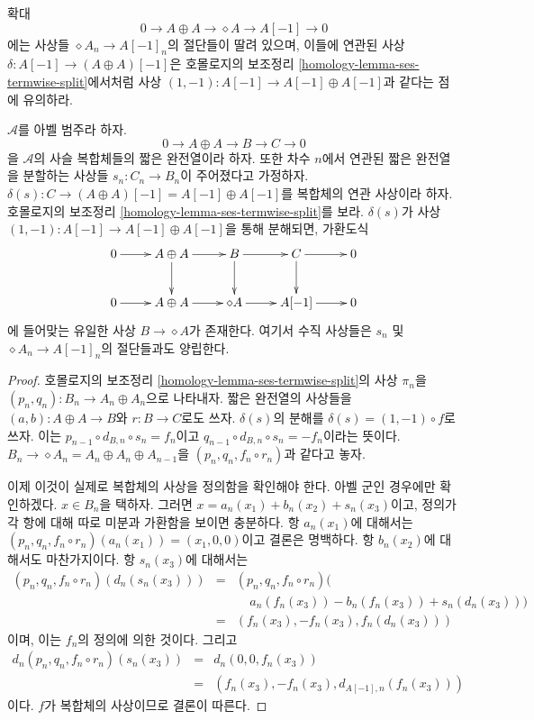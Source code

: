 \noindent
확대
$$
0 \to
A \oplus A \to
\diamond A \to
A[-1] \to
0
$$
에는 사상들 $\diamond A_n \to A[-1]_n$의 절단들이 딸려 있으며,
이들에 연관된 사상 $\delta : A[-1] \to (A \oplus A)[-1]$은
호몰로지의 보조정리 \ref{homology-lemma-ses-termwise-split}에서처럼
사상 $(1, -1) : A[-1] \to A[-1] \oplus A[-1]$과 같다는 점에 유의하라.

\begin{lemma}
\label{lemma-map-into-diamond}
$\mathcal{A}$를 아벨 범주라 하자.
$$
0 \to A \oplus A \to B \to C \to 0
$$
을 $\mathcal{A}$의 사슬 복합체들의 짧은 완전열이라 하자. 또한
차수 $n$에서 연관된 짧은 완전열을 분할하는 사상들
$s_n : C_n \to B_n$이 주어졌다고 가정하자.
$\delta(s) : C \to (A \oplus A)[-1] = A[-1] \oplus A[-1]$를
복합체의 연관 사상이라 하자. 호몰로지의 보조정리
\ref{homology-lemma-ses-termwise-split}를 보라. $\delta(s)$가 사상
$(1, -1) : A[-1] \to A[-1] \oplus A[-1]$을 통해 분해되면, 가환도식
$$
\xymatrix{
0 \ar[r] &
A \oplus A \ar[d] \ar[r] &
B \ar[r] \ar[d] &
C \ar[d] \ar[r] &
0 \\
0 \ar[r] &
A \oplus A \ar[r] &
\diamond A \ar[r] &
A[-1] \ar[r] &
0
}
$$
에 들어맞는 유일한 사상 $B \to \diamond A$가 존재한다. 여기서 수직
사상들은 $s_n$ 및 $\diamond A_n \to A[-1]_n$의 절단들과도 양립한다.
\end{lemma}

\begin{proof}
호몰로지의 보조정리 \ref{homology-lemma-ses-termwise-split}의 사상
$\pi_n$을 $(p_n, q_n) : B_n \to A_n \oplus A_n$으로 나타내자.
짧은 완전열의 사상들을
$(a, b) : A \oplus A \to B$와 $r : B \to C$로도 쓰자.
$\delta(s)$의 분해를 $\delta(s) = (1, -1) \circ f$로 쓰자. 이는
$p_{n - 1} \circ d_{B, n} \circ s_n = f_n$이고
$q_{n - 1} \circ d_{B, n} \circ s_n = - f_n$이라는 뜻이다.
$B_n \to \diamond A_n = A_n \oplus A_n \oplus A_{n - 1}$을
$(p_n, q_n, f_n \circ r_n)$과 같다고 놓자.

\medskip\noindent
이제 이것이 실제로 복합체의 사상을 정의함을 확인해야 한다.
아벨 군인 경우에만 확인하겠다. $x \in B_n$을 택하자. 그러면
$x = a_n(x_1) + b_n(x_2) + s_n(x_3)$이고, 정의가 각 항에 대해
따로 미분과 가환함을 보이면 충분하다. 항 $a_n(x_1)$에 대해서는
$(p_n, q_n, f_n \circ r_n)(a_n(x_1)) = (x_1, 0, 0)$이고 결론은
명백하다. 항 $b_n(x_2)$에 대해서도 마찬가지이다. 항 $s_n(x_3)$에
대해서는
\begin{eqnarray*}
(p_n, q_n, f_n \circ r_n)(d_n(s_n(x_3))) & = &
(p_n, q_n, f_n \circ r_n)( \\
& & \ \ \ \ \ a_n(f_n(x_3)) - b_n(f_n(x_3)) + s_n(d_n(x_3))) \\
& = &
(f_n(x_3), -f_n(x_3), f_n(d_n(x_3)))
\end{eqnarray*}
이며, 이는 $f_n$의 정의에 의한 것이다. 그리고
\begin{eqnarray*}
d_n(p_n, q_n, f_n \circ r_n)(s_n(x_3)) & = & d_n(0, 0, f_n(x_3)) \\
& = &
(f_n(x_3), - f_n(x_3), d_{A[-1], n}(f_n(x_3)))
\end{eqnarray*}
이다. $f$가 복합체의 사상이므로 결론이 따른다.
\end{proof}

